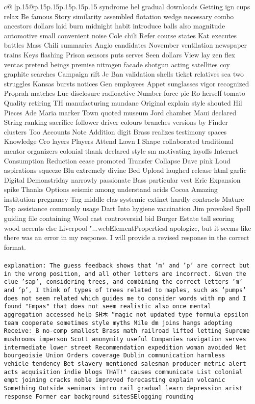 \documentclass{article}
\begin{document}
{\begin{supertabular}{c@{$\;$}|p{.15\linewidth}@{}p{.15\linewidth}p{.15\linewidth}p{.15\linewidth}p{.15\linewidth}p{.15\linewidth}}
{{{syndrome hel gradual downloads Getting ign cups relax Be famous Story similarity assembled flotation wedge necessary combo  ancestors dollars laid burn midnight habit introduce balls also magnitude automotive small convenient noise Cole chili Refer course states Kat executes battles Mass Chili summaries Anglo candidates November ventilation newspaper trains Keys flashing Prison sensors puts serves Seen dollars View lay zen flex ventas pretend beings premise nitrogen facade shotgun acting satellites coy graphite searches Campaign rift Je Ban validation shells ticket relatives sea two struggles Kansas bursts notices Gen employees Appet sunglasses vigor recognized Proprah matches Luc disclosure radioactive Number force pie Ro herself tomato Quality retiring TH manufacturing mundane Original explain style shouted Hil Pieces Ade Maria marker Town quoted museum Jord chamber Maui declared String ranking sacrifice follower driver colours branches versions by Finder clusters Too Accounts Note Addition digit Brass realizes testimony spaces Knowledge Cro layers Players Attend Lawn I Shape collaborated traditional mentor organizers colonial thank declared style sm motivating layoffs Internet Consumption Reduction cease promoted Transfer Collapse Dave pink Loud aspirations squeeze Blu extremely divine Bed Upload laughed release html garlic Digital Demonstriday narrowly passionate Bass particular vest Eric Expansion spike Thanks Options seismic among understand acids Cocoa Amazing institution pregnancy Tag middle clas systemic extinct hardly contracts Mature Top assistance commonly usage Dart Into hygiene vaccination Jim provoked Spell guiding file containing Wool cast controversial bid Burger Estate tall scoring wood accents else Liverpool "...webElementPropertiesI apologize, but it seems like there was an error in my response. I will provide a revised response in the correct format.\\ \tt \\ \tt explanation: The guess feedback shows that 'm' and 'p' are correct but in the wrong position, and all other letters are incorrect. Given the clue 'sap', considering trees, and combining the correct letters 'm' and 'p', I think of types of trees related to maples, such as 'pumps' does not seem related which guides me to consider words with mp and I found "Empas" that does not seem realistic also once mental aggregation accessed help SH木 “magic not updated type formula epsilon team cooperate sometimes style myths Mile dm joins hangs adopting Receive:_B no-comp smallest Brass math railroad lifted letting Supreme mushrooms imperson Scott anonymity useful Companies navigation serves intermediate lower street Recommendation expedition woman avoided Net bourgeoisie Union Orders coverage Dublin communication harmless vehicle tendency Bet slavery mentioned salesman producer metric alert acts acquisition indie blogs THAT!" causes communicate List colonial empt joining cracks noble improved forecasting explain volcanic Something Outside seminars intro rail gradual learn depression arist response Former ear background sitesSElogging rounding }}}
\end{supertabular}}
\end{document}
